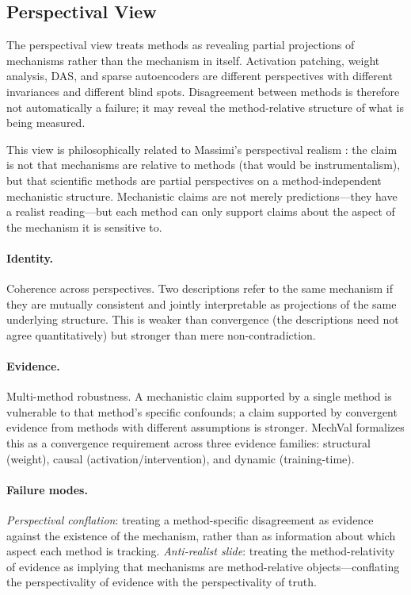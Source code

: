 \documentclass[11pt]{article}
\theoremstyle{remark}
\begin{document}
\subsection{Perspectival View}

The perspectival view treats methods as revealing partial projections of
mechanisms rather than the mechanism in itself.  Activation patching,
weight analysis, DAS, and sparse autoencoders are different perspectives
with different invariances and different blind spots.  Disagreement
between methods is therefore not automatically a failure; it may reveal
the method-relative structure of what is being measured.

This view is philosophically related to Massimi's perspectival realism
\citep{massimi2022}: the claim is not that mechanisms are relative to
methods (that would be instrumentalism), but that scientific methods
are partial perspectives on a method-independent mechanistic structure.
Mechanistic claims are not merely predictions---they have a realist
reading---but each method can only support claims about the aspect of
the mechanism it is sensitive to.

\paragraph{Identity.}
Coherence across perspectives.  Two descriptions refer to the same
mechanism if they are mutually consistent and jointly interpretable as
projections of the same underlying structure.  This is weaker than
convergence (the descriptions need not agree quantitatively) but
stronger than mere non-contradiction.

\paragraph{Evidence.}
Multi-method robustness.  A mechanistic claim supported by a single
method is vulnerable to that method's specific confounds; a claim
supported by convergent evidence from methods with different
assumptions is stronger.  MechVal \citep{tower2026mechval} formalizes
this as a convergence requirement across three evidence families:
structural (weight), causal (activation/intervention), and dynamic
(training-time).

\paragraph{Failure modes.}
\emph{Perspectival conflation}: treating a method-specific disagreement
as evidence against the existence of the mechanism, rather than as
information about which aspect each method is tracking.
\emph{Anti-realist slide}: treating the method-relativity of evidence
as implying that mechanisms are method-relative objects---conflating the
perspectivality of evidence with the perspectivality of truth.
\end{document}
